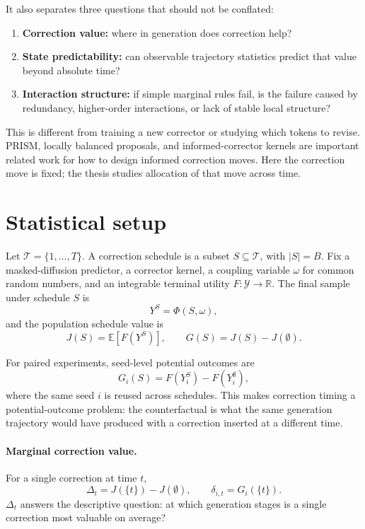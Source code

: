 \documentclass[11pt]{article}
\newcommand{\Tset}{\mathcal T}
\newcommand{\E}{\mathbb E}
\begin{document}
It also separates three questions that should not be conflated:
\begin{enumerate}
\item \textbf{Correction value:} where in generation does correction help?
\item \textbf{State predictability:} can observable trajectory statistics
predict that value beyond absolute time?
\item \textbf{Interaction structure:} if simple marginal rules fail, is the
failure caused by redundancy, higher-order interactions, or lack of stable
local structure?
\end{enumerate}

This is different from training a new corrector or studying which tokens to
revise.  PRISM, locally balanced proposals, and informed-corrector kernels are
important related work for how to design informed correction moves.  Here the
correction move is fixed; the thesis studies allocation of that move across
time.

\section*{Statistical setup}

Let \(\Tset=\{1,\ldots,T\}\).  A correction schedule is a subset
\(S\subseteq\Tset\), with \(|S|=B\).  Fix a masked-diffusion predictor, a
corrector kernel, a coupling variable \(\omega\) for common random numbers, and
an integrable terminal utility \(F:\mathcal Y\to\mathbb R\).  The final sample
under schedule \(S\) is
\[
Y^S=\Phi(S,\omega),
\]
and the population schedule value is
\[
J(S)=\E[F(Y^S)], \qquad G(S)=J(S)-J(\emptyset).
\]

For paired experiments, seed-level potential outcomes are
\[
G_i(S)=F(Y_i^S)-F(Y_i^\emptyset),
\]
where the same seed \(i\) is reused across schedules.  This makes correction
timing a potential-outcome problem: the counterfactual is what the same
generation trajectory would have produced with a correction inserted at a
different time.

\paragraph{Marginal correction value.}
For a single correction at time \(t\),
\[
\Delta_t=J(\{t\})-J(\emptyset), \qquad
\delta_{i,t}=G_i(\{t\}).
\]
\(\Delta_t\) answers the descriptive question: at which generation stages is a
single correction most valuable on average?
\end{document}

